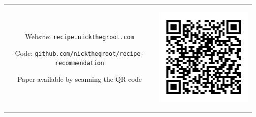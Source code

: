 \documentclass[landscape,a0b,final,a4resizeable]{a0poster}
\newenvironment{poster}{
  \begin{center}
  \begin{minipage}[c]{0.96\textwidth}
}{
  \end{minipage} 
  \end{center}
}
\theoremstyle{definition}
\theoremstyle{remark}
\begin{document}
\begin{poster}
\begin{multicols}{3}
    \begin{tabular}{cc}
      \begin{minipage}[c]{0.8\columnwidth}

        Website: \texttt{recipe.nickthegroot.com}

        Code: \texttt{github.com/nickthegroot/recipe-recommendation}

        Paper available by scanning the QR code

      \end{minipage}
       &
      \begin{minipage}[c]{0.2\columnwidth}
        \begin{centering}
          \includegraphics[width=\linewidth]{figures/report_qr.png}
        \end{centering}
      \end{minipage}
    \end{tabular}

  \end{multicols}

\end{poster}
\end{document}
